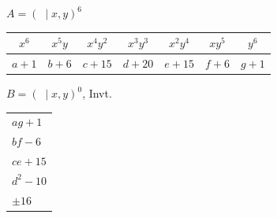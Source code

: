 \documentclass[11pt]{article}
\begin{document}
\newpage

\begin{center}
$A=(\;\mid x,y)^{6}$

\medskip
\begin{tabular}{|c|c|c|c|c|c|c|}
\hline
$x^{6}$ & $x^{5}y$ & $x^{4}y^{2}$ & $x^{3}y^{3}$ & $x^{2}y^{4}$ & $xy^{5}$ & $y^{6}$\\
\hline
$a+1$ & $b+6$ & $c+15$ & $d+20$ & $e+15$ & $f+6$ & $g+1$\\
\hline
\end{tabular}

\bigskip
$B=(\;\mid x,y)^{0}$, Invt.

\medskip
\begin{tabular}{|l|}
\hline
$ag+1$\\
$bf-6$\\
$ce+15$\\
$d^{2}-10$\\
\hline
$\pm 16$\\
\hline
\end{tabular}
\end{center}

\newpage
\end{document}
